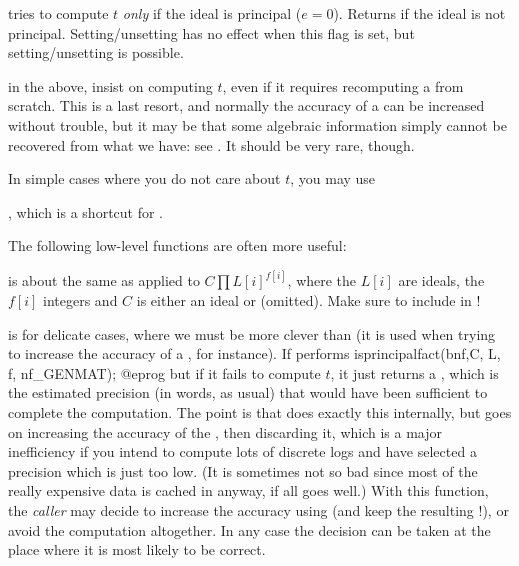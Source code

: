\item {} tries to compute $t$ \emph{only} if the
ideal is principal ($e = 0$). Returns  if the ideal is not
principal. Setting/unsetting  has no effect when this flag is
set, but setting/unsetting  is possible.

\item {} in the above, insist on computing $t$, even if it
requires recomputing a  from scratch. This is a last resort, and
normally the accuracy of a  can be increased without trouble, but it
may be that some algebraic information simply cannot be recovered from what
we have: see . It should be very rare, though.

In simple cases where you do not care about $t$, you may use

, which is a shortcut for
.

The following low-level functions are often more useful:

 is
about the same as  applied to $C \prod L[i]^{f[i]}$,
where the $L[i]$ are ideals, the $f[i]$ integers and $C$ is either an ideal
or  (omitted). Make sure to include  in !

 is
for delicate cases, where we must be more clever than 
(it is used when trying to increase the accuracy of a , for
instance). If performs
\bprog
  isprincipalfact(bnf,C, L, f, nf_GENMAT);
@eprog\noindent
but if it fails to compute $t$, it just returns a , which is the
estimated precision (in words, as usual) that would have been sufficient to
complete the computation. The point is that  does exactly this
internally, but goes on increasing the accuracy of the , then
discarding it, which is a major inefficiency if you intend to compute lots of
discrete logs and have selected a precision which is just too low.
(It is sometimes not so bad since most of the really expensive data is cached
in  anyway, if all goes well.)  With this function, the \emph{caller}
may decide to increase the accuracy using  (and keep the
resulting !), or avoid the computation altogether. In any case the
decision can be taken at the place where it is most likely to be correct.

